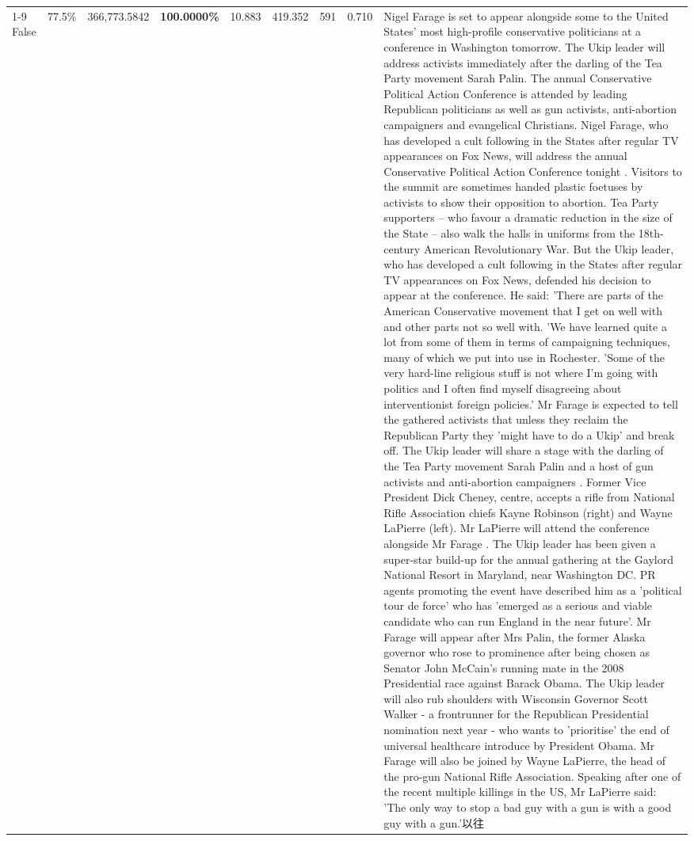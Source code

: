 \begin{table}[H]
\begin{tabular}{lllrlllll}
\cline{1-9}
False & 77.5\% & 366,773.5842 & \bfseries \color{red} 100.0000\% & 10.883 & 419.352 & 591 & 0.710 & Nigel Farage is set to appear alongside some to the United States' most high-profile conservative politicians at a conference in Washington tomorrow. The Ukip leader will address activists immediately after the darling of the Tea Party movement Sarah Palin. The annual Conservative Political Action Conference is attended by leading Republican politicians as well as gun activists, anti-abortion campaigners and evangelical Christians. Nigel Farage, who has developed a cult following in the States after regular TV appearances on Fox News, will address the annual Conservative Political Action Conference tonight . Visitors to the summit are sometimes handed plastic foetuses by activists to show their opposition to abortion. Tea Party supporters – who favour a dramatic reduction in the size of the State – also walk the halls in uniforms from the 18th-century American Revolutionary War. But the Ukip leader, who has developed a cult following in the States after regular TV appearances on Fox News, defended his decision to appear at the conference. He said: 'There are parts of the American Conservative movement that I get on well with and other parts not so well with. 'We have learned quite a lot from some of them in terms of campaigning techniques, many of which we put into use in Rochester. 'Some of the very hard-line religious stuff is not where I'm going with politics and I often find myself disagreeing about interventionist foreign policies.' Mr Farage is expected to tell the gathered activists that unless they reclaim the Republican Party they 'might have to do a Ukip' and break off. The Ukip leader will share a stage with the darling of the Tea Party movement Sarah Palin and a host of gun activists and anti-abortion campaigners . Former Vice President Dick Cheney, centre, accepts a rifle from National Rifle Association chiefs Kayne Robinson (right) and Wayne LaPierre (left). Mr LaPierre will attend the conference alongside Mr Farage . The Ukip leader has been given a super-star build-up for the annual gathering at the Gaylord National Resort in Maryland, near Washington DC. PR agents promoting the event have described him as a 'political tour de force' who has 'emerged as a serious and viable candidate who can run England in the near future'. Mr Farage will appear after Mrs Palin, the former Alaska governor who rose to prominence after being chosen as Senator John McCain's running mate in the 2008 Presidential race against Barack Obama. The Ukip leader will also rub shoulders with Wisconsin Governor Scott Walker - a frontrunner for the Republican Presidential nomination next year - who wants to 'prioritise' the end of universal healthcare introduce by President Obama. Mr Farage will also be joined by Wayne LaPierre, the head of the pro-gun National Rifle Association. Speaking after one of the recent multiple killings in the US, Mr LaPierre said: 'The only way to stop a bad guy with a gun is with a good guy with a gun.'以往 \\

\end{tabular}
\end{table}
